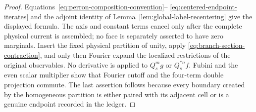 \documentclass[11pt]{article}
\begin{document}
\begin{proof}
Equations~\eqref{eq:perron-composition-convention}--
\eqref{eq:centered-endpoint-iterates} and the adjoint identity of
Lemma~\ref{lem:global-label-recentering} give the displayed formula.  The
axis and constant terms cancel only after the complete physical current is
assembled; no face is separately asserted to have zero marginals.  Insert
the fixed physical partition of unity, apply
\eqref{eq:branch-section-contraction}, and only then Fourier-expand the
localized restrictions of the original observables.  No derivative is applied to $Q_s^mg$ or
$Q_s^{*n}f$.  Fubini and the even scalar multiplier show that Fourier cutoff
and the four-term double projection commute.  The last assertion follows
because every boundary created by the homogeneous partition is either paired
with its adjacent cell or is a genuine endpoint recorded in the ledger.
\end{proof}
\end{document}
